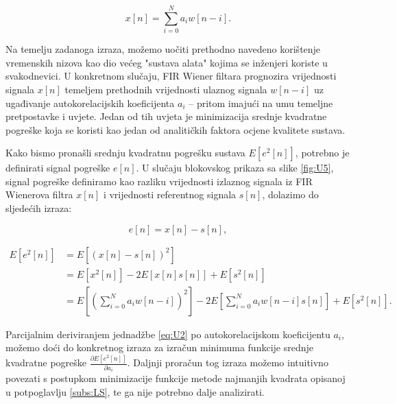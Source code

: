 \documentclass[a4paper,12pt,oneside]{memoir}
\begin{document}
                \begin{equation}
                    x[n]=\displaystyle\sum_{i=0}^{N}a_i w[n-i].
                \end{equation}

                Na temelju zadanoga izraza, možemo uočiti prethodno navedeno korištenje vremenskih nizova kao dio većeg "sustava alata" kojima se inženjeri koriste u svakodnevici. U konkretnom slučaju, FIR Wiener filtara prognozira vrijednosti signala $x[n]$ temeljem prethodnih vrijednosti ulaznog signala $w[n-i]$ uz ugađivanje autokorelacijskih koeficijenta $a_i$ -- pritom imajući na umu temeljne pretpostavke i uvjete. Jedan od tih uvjeta je minimizacija srednje kvadratne pogreške koja se koristi kao jedan od analitičkih faktora ocjene kvalitete sustava.

                Kako bismo pronašli srednju kvadratnu pogrešku sustava $E[e^2[n]]$, potrebno je definirati signal pogreške $e[n]$. U slučaju blokovskog prikaza sa slike \ref{fig:U5}, signal pogreške definiramo kao razliku vrijednosti izlaznog signala iz FIR Wienerova filtra $x[n]$ i vrijednosti referentnog signala $s[n]$, dolazimo do sljedećih izraza:

                \begin{equation}
                    e[n]=x[n]-s[n],
                \end{equation}
            
                \begin{equation}
                    \begin{split}
                        E\left[e^2[n]\right]&=E\left[\left(x[n]-s[n]\right)^2\right] \\
                        & = E\left[x^2[n]\right]-2E\left[x[n]s[n]\right]+E\left[s^2[n]\right] \\
                        & = E\left[\left(\displaystyle\sum_{i=0}^{N}a_i w[n-i]\right)^2\right]-2E\left[\displaystyle\sum_{i=0}^{N}a_i w[n-i]s[n]\right]+E\left[s^2[n]\right].
                    \end{split}
                    \label{eq:U2}
                \end{equation}

                Parcijalnim deriviranjem jednadžbe \eqref{eq:U2} po autokorelacijskom koeficijentu $a_i$, možemo doći do konkretnog izraza za izračun minimuma funkcije srednje kvadratne pogreške $\frac{\partial E[e^2[n]]}{\partial a_i}$. Daljnji proračun tog izraza možemo intuitivno povezati s postupkom minimizacije funkcije metode najmanjih kvadrata opisanoj u potpoglavlju \ref{subs:LS}, te ga nije potrebno dalje analizirati.
                
\end{document}
